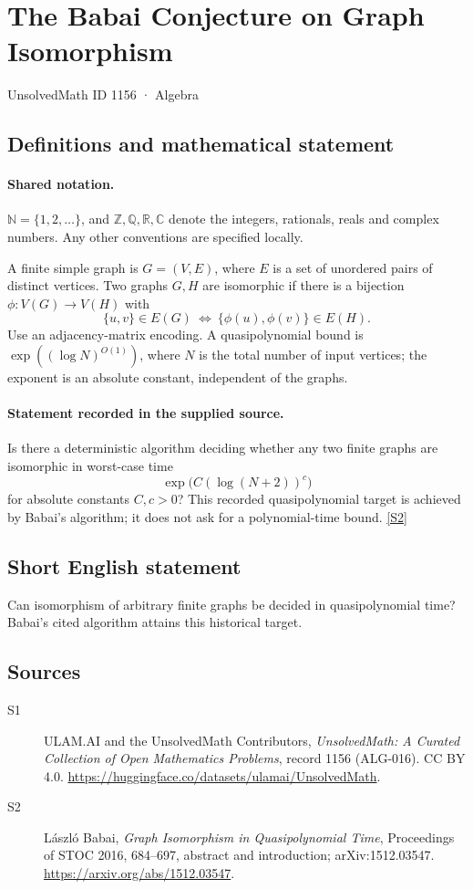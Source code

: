 \documentclass[11pt]{article}
\newcommand{\sref}[2]{\hyperlink{source:#1:#2}{[S#2]}}
\begin{document}
\setcounter{section}{1155}
\section{The Babai Conjecture on Graph Isomorphism}\label{1156}
{\small\sffamily UnsolvedMath ID 1156 · Algebra}
\subsection{Definitions and mathematical statement}

\paragraph{Shared notation.}$\mathbb N=\{1,2,\ldots\}$, and $\mathbb Z,\mathbb Q,\mathbb R,\mathbb C$ denote the integers, rationals, reals and complex numbers. Any other conventions are specified locally.


A finite simple graph is \(G=(V,E)\), where \(E\) is a set of
unordered pairs of distinct vertices.  Two graphs \(G,H\) are
isomorphic if there is a bijection \(\phi:V(G)\to V(H)\) with
\[
 \{u,v\}\in E(G)\ \Longleftrightarrow\
 \{\phi(u),\phi(v)\}\in E(H).
\]
Use an adjacency-matrix encoding.  A quasipolynomial bound is
\(\exp((\log N)^{O(1)})\), where \(N\) is the total number of input
vertices; the exponent is an absolute constant, independent of the graphs.
\paragraph{Statement recorded in the supplied source.}
Is there a deterministic algorithm deciding whether any two
finite graphs are isomorphic in worst-case time
\[
 \exp\bigl(C(\log(N+2))^c\bigr)
\]
for absolute constants \(C,c>0\)?
This recorded quasipolynomial target is achieved by Babai's algorithm;
it does not ask for a polynomial-time bound. \sref{1156}{2}
\subsection{Short English statement}
Can isomorphism of arbitrary finite graphs be decided in quasipolynomial time? Babai's cited algorithm attains this historical target.
\subsection{Sources}
\begin{description}
\item[\hypertarget{source:1156:1}{S1}] ULAM.AI and the UnsolvedMath Contributors, \emph{UnsolvedMath: A Curated Collection of Open Mathematics Problems}, record 1156 (ALG-016). CC BY 4.0. \url{https://huggingface.co/datasets/ulamai/UnsolvedMath}.
\item[\hypertarget{source:1156:2}{S2}] L\'aszl\'o Babai, \emph{Graph Isomorphism in Quasipolynomial Time}, Proceedings of STOC 2016, 684--697, abstract and introduction; arXiv:1512.03547. \url{https://arxiv.org/abs/1512.03547}.
\end{description}
\label{end:1156}
\end{document}
